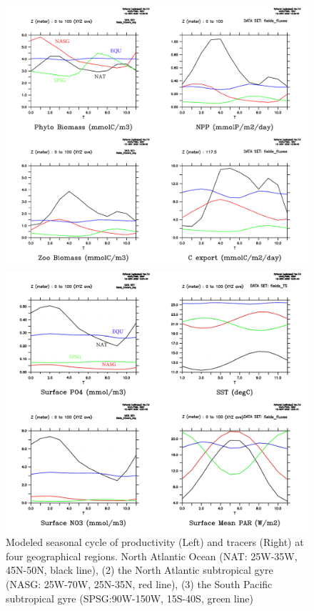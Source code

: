 \documentclass[a4paper]{article}
\begin{document}
\begin{enumerate}
\begin{figure}[h!]   %
   \centering
   \begin{minipage}{0.495\columnwidth}
      \centering
      \includegraphics[width=\columnwidth]{productivity_comparison.pdf}
   \end{minipage}
   \begin{minipage}{0.495\columnwidth}
      \centering
      \includegraphics[width=\columnwidth]{driver_comparison.pdf}
   \end{minipage}
   \caption[]{Modeled seasonal cycle of productivity (Left) and tracers (Right) at four geographical regions. North Atlantic Ocean (NAT: 25W-35W, 45N-50N, black line), (2) the North Atlantic subtropical gyre (NASG: 25W-70W, 25N-35N, red line), (3) the South Pacific subtropical gyre (SPSG:90W-150W, 15S-40S, green line)}
   \label{fig:mops_timeseries}
\end{figure}


\end{enumerate}
\end{document}
